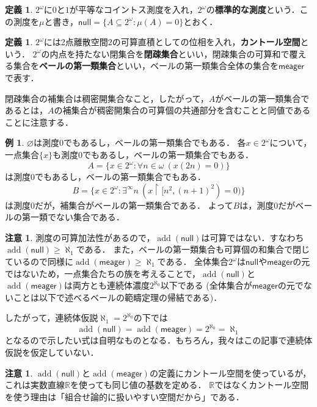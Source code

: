 \documentclass[uplatex,dvipdfmx]{jsarticle}
\newcommand{\R}{\mathbb{R}}
\newcommand{\add}{\operatorname{add}}
\newcommand{\nul}{\mathsf{null}}
\newcommand{\meager}{\mathsf{meager}}
\renewcommand\emptyset{\varnothing}
\renewcommand\subset{\subseteq}
\theoremstyle{definition}
\newtheorem{defi}[thm]{定義}
\newtheorem{exm}[thm]{例}
\newtheorem{rmk}[thm]{注意}
\theoremstyle{named}
\begin{document}
	\begin{defi}
		$2^\omega$に$0$と$1$が平等なコイントス測度を入れ，$2^\omega$の{\bfseries 標準的な測度}という．この測度を$\mu$と書き，$\nul = \{ A \subset 2^\omega : \mu(A) = 0 \}$とおく．
	\end{defi}
	
	\begin{defi}
		$2^\omega$には2点離散空間$2$の可算直積としての位相を入れ，{\bfseries カントール空間}という．
		$2^\omega$の内点を持たない閉集合を{\bfseries 閉疎集合}といい，閉疎集合の可算和で覆える集合を{\bfseries ベールの第一類集合}といい，ベールの第一類集合全体の集合を$\meager$で表す．
	\end{defi}

	閉疎集合の補集合は稠密開集合なこと，したがって，$A$がベールの第一類集合であるとは，$A$の補集合が稠密開集合の可算個の共通部分を含むことと同値であることに注意する．

	\begin{exm}
		$\emptyset$は測度0でもあるし，ベールの第一類集合でもある．
		各$x \in 2^\omega$について，一点集合$\{x\}$も測度0でもあるし，ベールの第一類集合でもある．
		\[
		A = \{ x \in 2^\omega : \forall n \in \omega\ (x(2n) = 0)\}
		\]
		は測度0でもあるし，ベールの第一類集合でもある．
		\[
		B = \{ x \in 2^\omega : \exists^\infty n \ (x \upharpoonright [n^2, (n+1)^2) = 0)\}
		\]
		は測度$0$だが，補集合がベールの第一類集合である．
		よって$B$は，測度$0$だがベールの第一類でない集合である．
	\end{exm}

	\begin{rmk}
		測度の可算加法性があるので，$\add(\nul)$は可算ではない．すなわち$\add(\nul) \ge \aleph_1$である．
		また，ベールの第一類集合も可算個の和集合で閉じているので同様に$\add(\meager) \ge \aleph_1$である．
		全体集合$2^\omega$は$\nul$や$\meager$の元ではないため，一点集合たちの族を考えることで，$\add(\nul)$と$\add(\meager)$は両方とも連続体濃度$2^{\aleph_0}$以下である
		(全体集合が$\meager$の元でないことは以下で述べるベールの範疇定理の帰結である)．
		
		したがって，連続体仮説$\aleph_1 = 2^{\aleph_0}$の下では
		\[
		\add(\nul) = \add(\meager) = 2^{\aleph_0} = \aleph_1
		\]
		となるので示したい式は自明なものとなる．もちろん，我々はこの記事で連続体仮説を仮定していない．
	\end{rmk}

	\begin{rmk}
		$\add(\nul)$と$\add(\meager)$の定義にカントール空間を使っているが，これは実数直線$\R$を使っても同じ値の基数を定める．
		$\R$ではなくカントール空間を使う理由は「組合せ論的に扱いやすい空間だから」である．
	\end{rmk}
\end{document}
